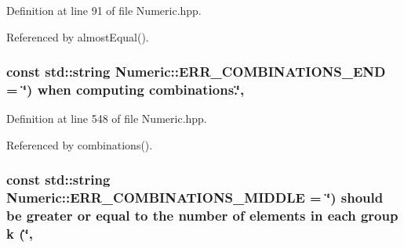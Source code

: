 Definition at line 91 of file Numeric.\-hpp.



Referenced by almost\-Equal().

\hypertarget{classmultiscale_1_1Numeric_a5f24aa1c11749deac42726f349131db5}{
\subsubsection[{E\-R\-R\-\_\-\-C\-O\-M\-B\-I\-N\-A\-T\-I\-O\-N\-S\-\_\-\-E\-N\-D}]{\setlength{\rightskip}{0pt plus 5cm}const std\-::string Numeric\-::\-E\-R\-R\-\_\-\-C\-O\-M\-B\-I\-N\-A\-T\-I\-O\-N\-S\-\_\-\-E\-N\-D = \char`\"{}) when computing combinations.\char`\"{}\hspace{0.3cm}{\ttfamily [static]}, {\ttfamily [private]}}}\label{classmultiscale_1_1Numeric_a5f24aa1c11749deac42726f349131db5}


Definition at line 548 of file Numeric.\-hpp.



Referenced by combinations().

\hypertarget{classmultiscale_1_1Numeric_a0228a04871361c5e0dc8d90c53eed803}{
\subsubsection[{E\-R\-R\-\_\-\-C\-O\-M\-B\-I\-N\-A\-T\-I\-O\-N\-S\-\_\-\-M\-I\-D\-D\-L\-E}]{\setlength{\rightskip}{0pt plus 5cm}const std\-::string Numeric\-::\-E\-R\-R\-\_\-\-C\-O\-M\-B\-I\-N\-A\-T\-I\-O\-N\-S\-\_\-\-M\-I\-D\-D\-L\-E = \char`\"{}) should be greater or equal to the number of elements in each group k (\char`\"{}\hspace{0.3cm}{\ttfamily [static]}, {\ttfamily [private]}}}\label{classmultiscale_1_1Numeric_a0228a04871361c5e0dc8d90c53eed803}


